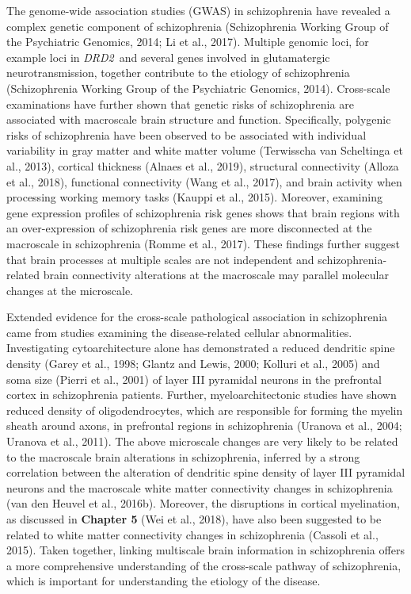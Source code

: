 \begin{refsection}
The genome-wide association studies (GWAS) in schizophrenia have revealed a complex genetic component of schizophrenia (Schizophrenia Working Group of the Psychiatric Genomics, 2014; Li et al., 2017). Multiple genomic loci, for example loci in \textit{DRD2}\ and several genes involved in glutamatergic neurotransmission,  together contribute to the etiology of schizophrenia (Schizophrenia Working Group of the Psychiatric Genomics, 2014). Cross-scale examinations have further shown that genetic risks of schizophrenia are associated with macroscale brain structure and function. Specifically, polygenic risks of schizophrenia have been observed to be associated with individual variability in gray matter and white matter volume (Terwisscha van Scheltinga et al., 2013), cortical thickness (Alnaes et al., 2019), structural connectivity (Alloza et al., 2018), functional connectivity (Wang et al., 2017), and brain activity when processing working memory tasks (Kauppi et al., 2015). Moreover, examining gene expression profiles of schizophrenia risk genes shows that brain regions with an over-expression of schizophrenia risk genes are more disconnected at the macroscale in schizophrenia (Romme et al., 2017). These findings further suggest that brain processes at multiple scales are not independent and schizophrenia-related brain connectivity alterations at the macroscale may parallel molecular changes at the microscale.

Extended evidence for the cross-scale pathological association in schizophrenia came from studies examining the disease-related cellular abnormalities. Investigating cytoarchitecture alone has demonstrated a reduced dendritic spine density (Garey et al., 1998; Glantz and Lewis, 2000; Kolluri et al., 2005) and soma size (Pierri et al., 2001) of layer III pyramidal neurons in the prefrontal cortex in schizophrenia patients. Further, myeloarchitectonic studies have shown reduced density of oligodendrocytes, which are responsible for forming the myelin sheath around axons, in prefrontal regions in schizophrenia (Uranova et al., 2004; Uranova et al., 2011). The above microscale changes are very likely to be related to the macroscale brain alterations in schizophrenia, inferred by a strong correlation between the alteration of dendritic spine density of layer III pyramidal neurons and the macroscale white matter connectivity changes in schizophrenia (van den Heuvel et al., 2016b). Moreover, the disruptions in cortical myelination, as discussed in \textbf{Chapter 5} (Wei et al., 2018), have also been suggested to be related to white matter connectivity changes in schizophrenia (Cassoli et al., 2015). Taken together, linking multiscale brain information in schizophrenia offers a more comprehensive understanding of the cross-scale pathway of schizophrenia, which is important for understanding the etiology of the disease.


\end{refsection}
